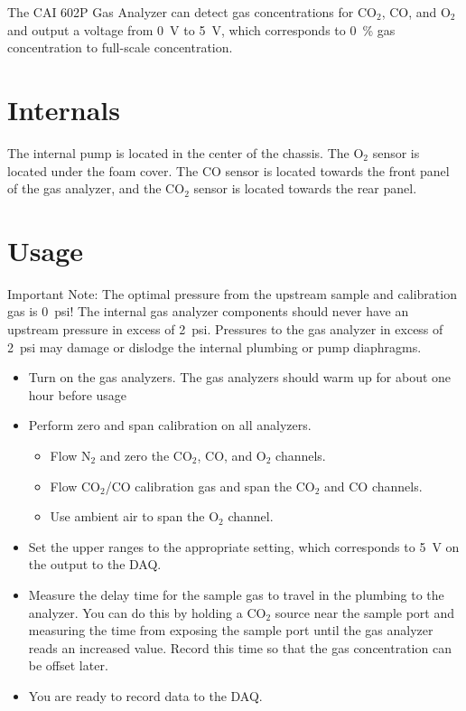 \documentclass[11pt,oneside]{book}
\begin{document}
The CAI 602P Gas Analyzer can detect gas concentrations for CO$_2$, CO, and O$_2$ and output a voltage from 0~V to 5~V, which corresponds to 0~\% gas concentration to full-scale concentration.

\section{Internals}

The internal pump is located in the center of the chassis. The O$_2$ sensor is located under the foam cover. The CO sensor is located towards the front panel of the gas analyzer, and the CO$_2$ sensor is located towards the rear panel.

\section{Usage}

Important Note: The optimal pressure from the upstream sample and calibration gas is 0~psi! The internal gas analyzer components should never have an upstream pressure in excess of 2~psi. Pressures to the gas analyzer in excess of 2~psi may damage or dislodge the internal plumbing or pump diaphragms.

\begin{itemize}
\item Turn on the gas analyzers. The gas analyzers should warm up for about one hour before usage
\item Perform zero and span calibration on all analyzers.
    \begin{itemize}
    \item Flow N$_2$ and zero the CO$_2$, CO, and O$_2$ channels.
    \item Flow CO$_2$/CO calibration gas and span the CO$_2$ and CO channels.
    \item Use ambient air to span the O$_2$ channel.
    \end{itemize}
\item Set the upper ranges to the appropriate setting, which corresponds to 5~V on the output to the DAQ.
\item Measure the delay time for the sample gas to travel in the plumbing to the analyzer. You can do this by holding a CO$_2$ source near the sample port and measuring the time from exposing the sample port until the gas analyzer reads an increased value. Record this time so that the gas concentration can be offset later.
\item You are ready to record data to the DAQ.
\end{itemize}
\end{document}
